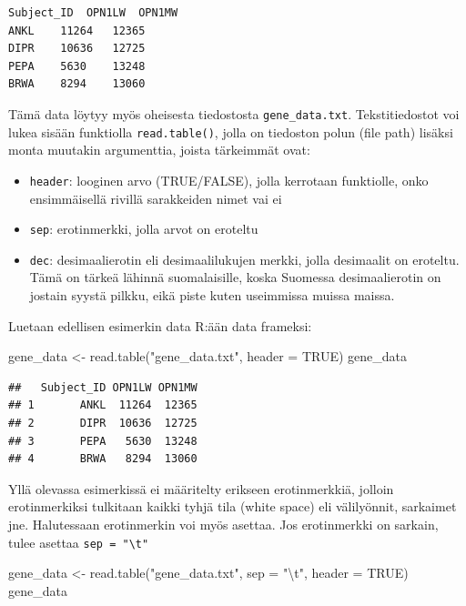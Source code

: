 \documentclass[
]{book}
\newenvironment{Shaded}{\begin{snugshade}}{\end{snugshade}}
\newcommand{\AttributeTok}[1]{\textcolor[rgb]{0.77,0.63,0.00}{#1}}
\newcommand{\ConstantTok}[1]{\textcolor[rgb]{0.00,0.00,0.00}{#1}}
\newcommand{\FunctionTok}[1]{\textcolor[rgb]{0.00,0.00,0.00}{#1}}
\newcommand{\NormalTok}[1]{#1}
\newcommand{\OtherTok}[1]{\textcolor[rgb]{0.56,0.35,0.01}{#1}}
\newcommand{\SpecialCharTok}[1]{\textcolor[rgb]{0.00,0.00,0.00}{#1}}
\newcommand{\StringTok}[1]{\textcolor[rgb]{0.31,0.60,0.02}{#1}}
\providecommand{\tightlist}{%
  \setlength{\itemsep}{0pt}\setlength{\parskip}{0pt}}
\begin{document}
\begin{verbatim}
Subject_ID  OPN1LW  OPN1MW
ANKL    11264   12365
DIPR    10636   12725
PEPA    5630    13248
BRWA    8294    13060
\end{verbatim}

Tämä data löytyy myös oheisesta tiedostosta \texttt{gene\_data.txt}. Tekstitiedostot voi lukea sisään funktiolla \texttt{read.table()}, jolla on tiedoston polun (file path) lisäksi monta muutakin argumenttia, joista tärkeimmät ovat:

\begin{itemize}
\tightlist
\item
  \texttt{header}: looginen arvo (TRUE/FALSE), jolla kerrotaan funktiolle, onko ensimmäisellä rivillä sarakkeiden nimet vai ei
\item
  \texttt{sep}: erotinmerkki, jolla arvot on eroteltu
\item
  \texttt{dec}: desimaalierotin eli desimaalilukujen merkki, jolla desimaalit on eroteltu. Tämä on tärkeä lähinnä suomalaisille, koska Suomessa desimaalierotin on jostain syystä pilkku, eikä piste kuten useimmissa muissa maissa.
\end{itemize}

Luetaan edellisen esimerkin data R:ään data frameksi:

\begin{Shaded}
\begin{Highlighting}[]
\NormalTok{gene\_data }\OtherTok{\textless{}{-}} \FunctionTok{read.table}\NormalTok{(}\StringTok{"gene\_data.txt"}\NormalTok{, }\AttributeTok{header =} \ConstantTok{TRUE}\NormalTok{)}
\NormalTok{gene\_data}
\end{Highlighting}
\end{Shaded}

\begin{verbatim}
##   Subject_ID OPN1LW OPN1MW
## 1       ANKL  11264  12365
## 2       DIPR  10636  12725
## 3       PEPA   5630  13248
## 4       BRWA   8294  13060
\end{verbatim}

Yllä olevassa esimerkissä ei määritelty erikseen erotinmerkkiä, jolloin erotinmerkiksi tulkitaan kaikki tyhjä tila (white space) eli välilyönnit, sarkaimet jne. Halutessaan erotinmerkin voi myös asettaa. Jos erotinmerkki on sarkain, tulee asettaa \texttt{sep\ =\ "\textbackslash{}t"}

\begin{Shaded}
\begin{Highlighting}[]
\NormalTok{gene\_data }\OtherTok{\textless{}{-}} \FunctionTok{read.table}\NormalTok{(}\StringTok{"gene\_data.txt"}\NormalTok{, }\AttributeTok{sep =} \StringTok{"}\SpecialCharTok{\textbackslash{}t}\StringTok{"}\NormalTok{, }\AttributeTok{header =} \ConstantTok{TRUE}\NormalTok{)}
\NormalTok{gene\_data}
\end{Highlighting}
\end{Shaded}
\end{document}

